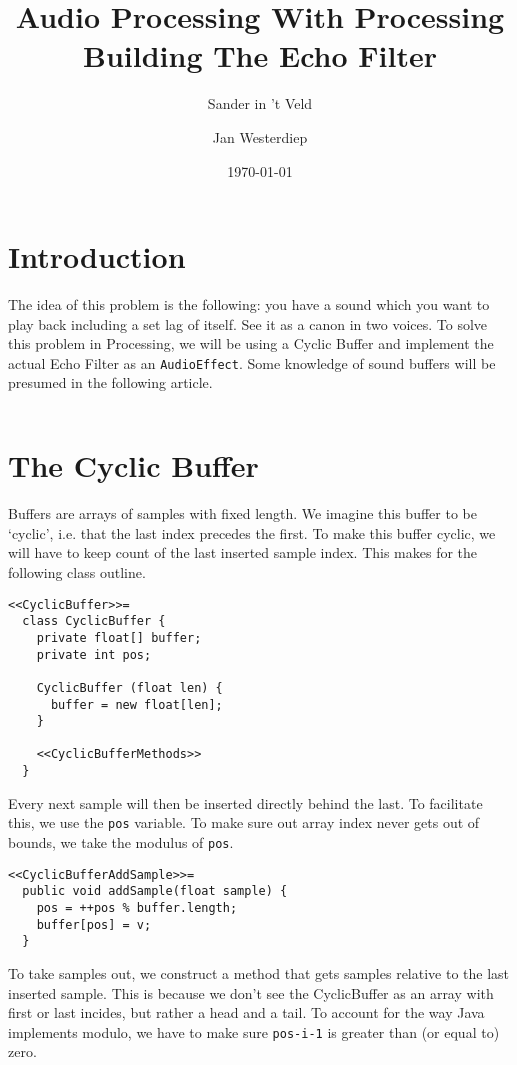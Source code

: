 \documentclass[11pt]{amsart}
\begin{document}
\title{Audio Processing With Processing\\Building The Echo Filter}
\author{Sander in 't Veld \and Jan Westerdiep}
\date{\today}
\maketitle

\section{Introduction}
The idea of this problem is the following: you have a sound which you want to play back including a set lag of itself. See it as a canon in two voices. To solve this problem in Processing, we will be using a Cyclic Buffer and implement the actual Echo Filter as an \texttt{AudioEffect}. Some knowledge of sound buffers will be presumed in the following article.

\begin{verbatim}

\end{verbatim}

\section{The Cyclic Buffer}
Buffers are arrays of samples with fixed length. We imagine this buffer to be `cyclic', i.e. that the last index precedes the first. To make this buffer cyclic, we will have to keep count of the last inserted sample index. This makes for the following class outline.
\begin{verbatim}
<<CyclicBuffer>>= 
  class CyclicBuffer {
    private float[] buffer;
    private int pos;

    CyclicBuffer (float len) {
      buffer = new float[len];
    }

    <<CyclicBufferMethods>>
  }
\end{verbatim}

Every next sample will then be inserted directly behind the last. To facilitate this, we use the \texttt{pos} variable. To make sure out array index never gets out of bounds, we take the modulus of \texttt{pos}.
\begin{verbatim}
<<CyclicBufferAddSample>>= 
  public void addSample(float sample) {
    pos = ++pos % buffer.length;
    buffer[pos] = v;
  }
\end{verbatim}

To take samples out, we construct a method that gets samples relative to the last inserted sample. This is because we don't see the CyclicBuffer as an array with first or last incides, but rather a head and a tail. To account for the way Java implements modulo, we have to make sure \texttt{pos-i-1} is greater than (or equal to) zero.
\end{document}
